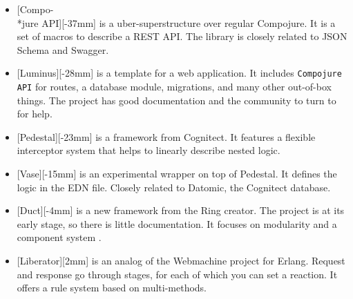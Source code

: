 \begin{itemize}


\item
{}[Compo-\\*jure API][-37mm] is a uber-superstructure over regular Compojure. It is a set of macros to describe a REST API. The library is closely related to JSON Schema and Swagger.


\item
{}[Luminus][-28mm] is a template for a web application. It includes \verb|Compojure API| for routes, a database module, migrations, and many other out-of-box things. The project has good documentation and the community to turn to for help.


\item
{}[Pedestal][-23mm] is a framework from Cognitect. It features a flexible interceptor system that helps to linearly describe nested logic.


\item
{}[Vase][-15mm] is an experimental wrapper on top of Pedestal. It defines the logic in the EDN file. Closely related to Datomic, the Cognitect database.


\item
{}[Duct][-4mm] is a new framework from the Ring creator. The project is at its early stage, so there is little documentation. It focuses on modularity and a component system .


\item
{}[Liberator][2mm] is an analog of the Webmachine project for Erlang. Request and response go through
stages, for each of which you can set a reaction. It offers a rule system based on multi-methods.

\end{itemize}

